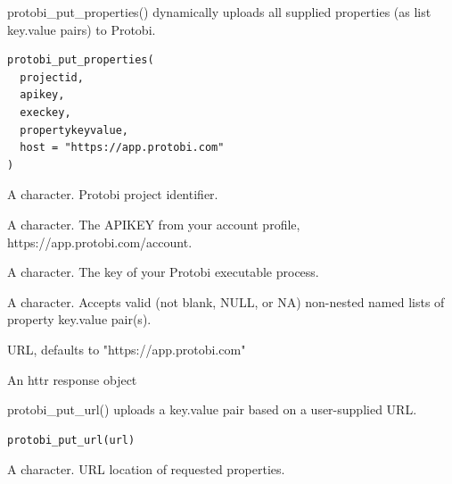\documentclass[a4paper]{book}
\begin{document}
%
\begin{Description}\relax
protobi\_put\_properties() dynamically uploads all supplied properties (as list key.value pairs) to Protobi.
\end{Description}
%
\begin{Usage}
\begin{verbatim}
protobi_put_properties(
  projectid,
  apikey,
  execkey,
  propertykeyvalue,
  host = "https://app.protobi.com"
)
\end{verbatim}
\end{Usage}
%
\begin{Arguments}
\begin{ldescription}
\item[\code{projectid}] A character. Protobi project identifier.

\item[\code{apikey}] A character. The APIKEY from your account profile, https://app.protobi.com/account.

\item[\code{execkey}] A character. The key of your Protobi executable process.

\item[\code{propertykeyvalue}] A character. Accepts valid (not blank, NULL, or NA) non-nested named lists of property key.value pair(s).

\item[\code{host}] URL, defaults to "https://app.protobi.com"
\end{ldescription}
\end{Arguments}
%
\begin{Value}
An httr response object
\end{Value}
%
\begin{SeeAlso}
\end{SeeAlso}
%
\begin{Description}\relax
protobi\_put\_url() uploads a key.value pair based on a user-supplied URL.
\end{Description}
%
\begin{Usage}
\begin{verbatim}
protobi_put_url(url)
\end{verbatim}
\end{Usage}
%
\begin{Arguments}
\begin{ldescription}
\item[\code{url}] A character. URL location of requested properties.
\end{ldescription}
\end{Arguments}
\end{document}
